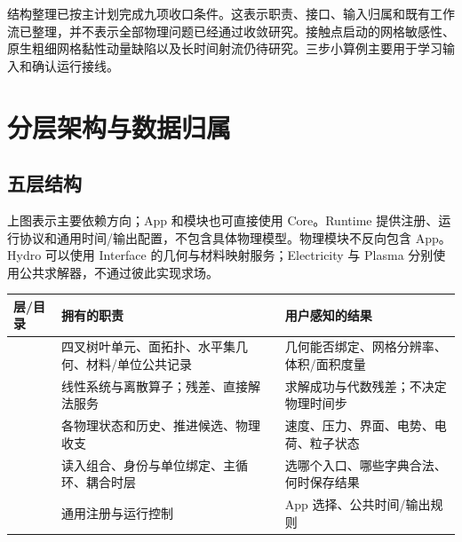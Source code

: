\documentclass[a4paper,11pt]{article}
\begin{document}
结构整理已按主计划完成九项收口条件。这表示职责、接口、输入归属和既有工作流已整理，并不表示全部物理问题已经通过收敛研究。接触点启动的网格敏感性、原生粗细网格黏性动量缺陷以及长时间射流仍待研究。三步小算例主要用于学习输入和确认运行接线。

\section{分层架构与数据归属}
\subsection{五层结构}
\begin{center}
\end{center}
上图表示主要依赖方向；App 和模块也可直接使用 Core。Runtime 提供注册、运行协议和通用时间/输出配置，不包含具体物理模型。物理模块不反向包含 App。Hydro 可以使用 Interface 的几何与材料映射服务；Electricity 与 Plasma 分别使用公共求解器，不通过彼此实现求场。

\begin{longtable}{L{.20\linewidth}L{.42\linewidth}L{.30\linewidth}}
\toprule 层/目录 & 拥有的职责 & 用户感知的结果 \\\midrule\endhead
{} & 四叉树叶单元、面拓扑、水平集几何、材料/单位公共记录 & 几何能否绑定、网格分辨率、体积/面积度量 \\
 & 线性系统与离散算子；残差、直接解法服务 & 求解成功与代数残差；不决定物理时间步 \\
 & 各物理状态和历史、推进候选、物理收支 & 速度、压力、界面、电势、电荷、粒子状态 \\
 & 读入组合、身份与单位绑定、主循环、耦合时层 & 选哪个入口、哪些字典合法、何时保存结果 \\
 & 通用注册与运行控制 & App 选择、公共时间/输出规则 \\
\bottomrule
\end{longtable}
\end{document}
